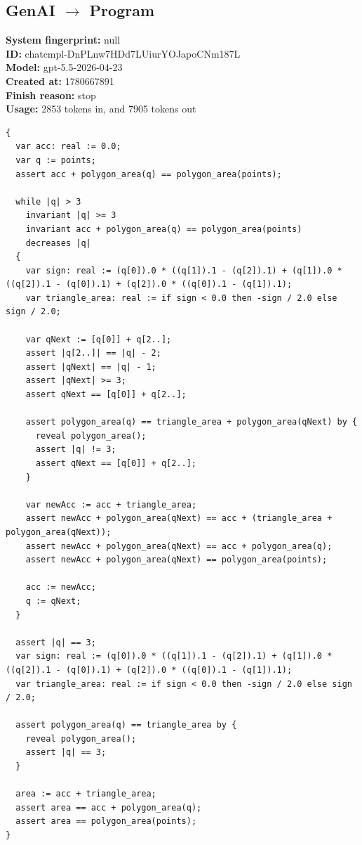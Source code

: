 \documentclass{article}
\begin{document}
\subsection*{GenAI $\rightarrow$ Program}
\textbf{System fingerprint: }null
\\\textbf{ID: }chatcmpl-DnPLnw7HDd7LUiurYOJapoCNm187L
\\\textbf{Model: }gpt-5.5-2026-04-23
\\\textbf{Created at: }1780667891
\\\textbf{Finish reason: }stop
\\\textbf{Usage: }2853 tokens in, and 7905 tokens out
\begin{lstlisting}
{
  var acc: real := 0.0;
  var q := points;
  assert acc + polygon_area(q) == polygon_area(points);

  while |q| > 3
    invariant |q| >= 3
    invariant acc + polygon_area(q) == polygon_area(points)
    decreases |q|
  {
    var sign: real := (q[0]).0 * ((q[1]).1 - (q[2]).1) + (q[1]).0 * ((q[2]).1 - (q[0]).1) + (q[2]).0 * ((q[0]).1 - (q[1]).1);
    var triangle_area: real := if sign < 0.0 then -sign / 2.0 else sign / 2.0;

    var qNext := [q[0]] + q[2..];
    assert |q[2..]| == |q| - 2;
    assert |qNext| == |q| - 1;
    assert |qNext| >= 3;
    assert qNext == [q[0]] + q[2..];

    assert polygon_area(q) == triangle_area + polygon_area(qNext) by {
      reveal polygon_area();
      assert |q| != 3;
      assert qNext == [q[0]] + q[2..];
    }

    var newAcc := acc + triangle_area;
    assert newAcc + polygon_area(qNext) == acc + (triangle_area + polygon_area(qNext));
    assert newAcc + polygon_area(qNext) == acc + polygon_area(q);
    assert newAcc + polygon_area(qNext) == polygon_area(points);

    acc := newAcc;
    q := qNext;
  }

  assert |q| == 3;
  var sign: real := (q[0]).0 * ((q[1]).1 - (q[2]).1) + (q[1]).0 * ((q[2]).1 - (q[0]).1) + (q[2]).0 * ((q[0]).1 - (q[1]).1);
  var triangle_area: real := if sign < 0.0 then -sign / 2.0 else sign / 2.0;

  assert polygon_area(q) == triangle_area by {
    reveal polygon_area();
    assert |q| == 3;
  }

  area := acc + triangle_area;
  assert area == acc + polygon_area(q);
  assert area == polygon_area(points);
}
\end{lstlisting}
\end{document}
